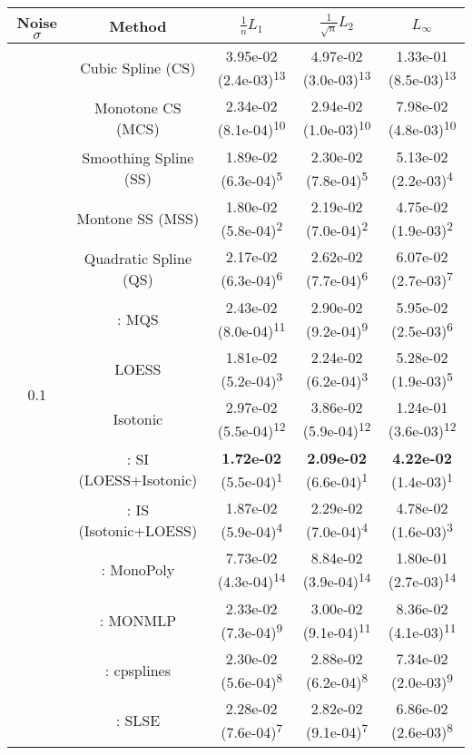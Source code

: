 \begin{tabular}{ccccc}
\toprule
Noise $\sigma$ & Method&$\frac 1n L_1$&$\frac{1}{\sqrt n}L_2$&$L_\infty$\tabularnewline
\midrule
\multirow{14}{*}{0.1}&Cubic Spline (CS)& 3.95e-02 (2.4e-03)\textsuperscript{13}& 4.97e-02 (3.0e-03)\textsuperscript{13}& 1.33e-01 (8.5e-03)\textsuperscript{13}\tabularnewline
&Monotone CS (MCS)& 2.34e-02 (8.1e-04)\textsuperscript{10}& 2.94e-02 (1.0e-03)\textsuperscript{10}& 7.98e-02 (4.8e-03)\textsuperscript{10}\tabularnewline
&Smoothing Spline (SS)& 1.89e-02 (6.3e-04)\textsuperscript{5}& 2.30e-02 (7.8e-04)\textsuperscript{5}& 5.13e-02 (2.2e-03)\textsuperscript{4}\tabularnewline
&Montone SS (MSS)& 1.80e-02 (5.8e-04)\textsuperscript{2}& 2.19e-02 (7.0e-04)\textsuperscript{2}& 4.75e-02 (1.9e-03)\textsuperscript{2}\tabularnewline
&Quadratic Spline (QS)& 2.17e-02 (6.3e-04)\textsuperscript{6}& 2.62e-02 (7.7e-04)\textsuperscript{6}& 6.07e-02 (2.7e-03)\textsuperscript{7}\tabularnewline
&\textcite{heMonotoneBsplineSmoothing1998}: MQS& 2.43e-02 (8.0e-04)\textsuperscript{11}& 2.90e-02 (9.2e-04)\textsuperscript{9}& 5.95e-02 (2.5e-03)\textsuperscript{6}\tabularnewline
&LOESS& 1.81e-02 (5.2e-04)\textsuperscript{3}& 2.24e-02 (6.2e-04)\textsuperscript{3}& 5.28e-02 (1.9e-03)\textsuperscript{5}\tabularnewline
&Isotonic& 2.97e-02 (5.5e-04)\textsuperscript{12}& 3.86e-02 (5.9e-04)\textsuperscript{12}& 1.24e-01 (3.6e-03)\textsuperscript{12}\tabularnewline
&\textcite{mammenEstimatingSmoothMonotone1991}: SI (LOESS+Isotonic)& \textbf{1.72e-02} (5.5e-04)\textsuperscript{1}& \textbf{2.09e-02} (6.6e-04)\textsuperscript{1}& \textbf{4.22e-02} (1.4e-03)\textsuperscript{1}\tabularnewline
&\textcite{mammenEstimatingSmoothMonotone1991}: IS (Isotonic+LOESS)& 1.87e-02 (5.9e-04)\textsuperscript{4}& 2.29e-02 (7.0e-04)\textsuperscript{4}& 4.78e-02 (1.6e-03)\textsuperscript{3}\tabularnewline
&\textcite{murrayFastFlexibleMethods2016a}: MonoPoly& 7.73e-02 (4.3e-04)\textsuperscript{14}& 8.84e-02 (3.9e-04)\textsuperscript{14}& 1.80e-01 (2.7e-03)\textsuperscript{14}\tabularnewline
&\textcite{cannonMonmlpMultilayerPerceptron2017}: MONMLP& 2.33e-02 (7.3e-04)\textsuperscript{9}& 3.00e-02 (9.1e-04)\textsuperscript{11}& 8.36e-02 (4.1e-03)\textsuperscript{11}\tabularnewline
&\textcite{navarro-garciaConstrainedSmoothingOutofrange2023}: cpsplines& 2.30e-02 (5.6e-04)\textsuperscript{8}& 2.88e-02 (6.2e-04)\textsuperscript{8}& 7.34e-02 (2.0e-03)\textsuperscript{9}\tabularnewline
&\textcite{groeneboomConfidenceIntervalsMonotone2023}: SLSE& 2.28e-02 (7.6e-04)\textsuperscript{7}& 2.82e-02 (9.1e-04)\textsuperscript{7}& 6.86e-02 (2.6e-03)\textsuperscript{8}\tabularnewline

\end{tabular}
